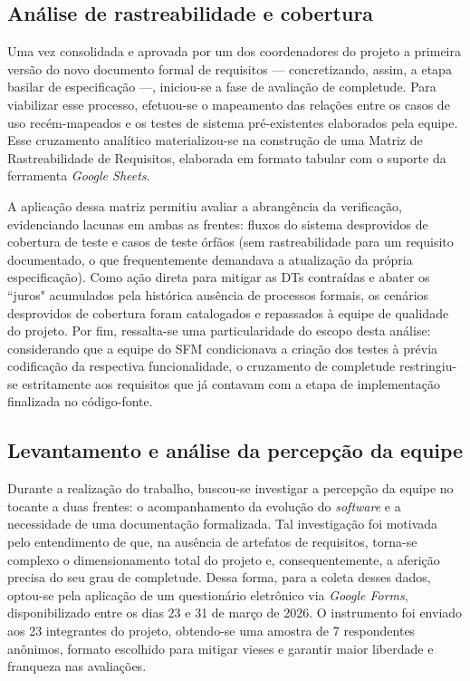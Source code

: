 \subsection{Análise de rastreabilidade e cobertura}

Uma vez consolidada e aprovada por um dos coordenadores do projeto a primeira versão do novo documento formal de requisitos — concretizando, assim, a etapa basilar de especificação —, iniciou-se a fase de avaliação de completude. Para viabilizar esse processo, efetuou-se o mapeamento das relações entre os casos de uso recém-mapeados e os testes de sistema pré-existentes elaborados pela equipe. Esse cruzamento analítico materializou-se na construção de uma Matriz de Rastreabilidade de Requisitos, elaborada em formato tabular com o suporte da ferramenta \textit{Google Sheets}. 

A aplicação dessa matriz permitiu avaliar a abrangência da verificação, evidenciando lacunas em ambas as frentes: fluxos do sistema desprovidos de cobertura de teste e casos de teste órfãos (sem rastreabilidade para um requisito documentado, o que frequentemente demandava a atualização da própria especificação). Como ação direta para mitigar as DTs contraídas e abater os ``juros" acumulados pela histórica ausência de processos formais, os cenários desprovidos de cobertura foram catalogados e repassados à equipe de qualidade do projeto. Por fim, ressalta-se uma particularidade do escopo desta análise: considerando que a equipe do SFM condicionava a criação dos testes à prévia codificação da respectiva funcionalidade, o cruzamento de completude restringiu-se estritamente aos requisitos que já contavam com a etapa de implementação finalizada no código-fonte.

\subsection{Levantamento e análise da percepção da equipe}

Durante a realização do trabalho, buscou-se investigar a percepção da equipe no tocante a duas frentes: o acompanhamento da evolução do \textit{software} e a necessidade de uma documentação formalizada. Tal investigação foi motivada pelo entendimento de que, na ausência de artefatos de requisitos, torna-se complexo o dimensionamento total do projeto e, consequentemente, a aferição precisa do seu grau de completude. Dessa forma, para a coleta desses dados, optou-se pela aplicação de um questionário eletrônico via \textit{Google Forms}, disponibilizado entre os dias 23 e 31 de março de 2026. O instrumento foi enviado aos 23 integrantes do projeto, obtendo-se uma amostra de 7 respondentes anônimos, formato escolhido para mitigar vieses e garantir maior liberdade e franqueza nas avaliações.

